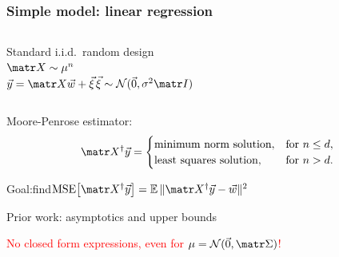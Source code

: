 \begin{frame}
  \frametitle{Simple model: linear regression}
  \begin{columns}
    \begin{column}{0.5\textwidth}
      \vspace{2mm}
      
      Standard i.i.d.~random design\\
$\X\sim\mu^n$\\
$\y=\X\w+\xib$\qquad$\xib\sim\Nc(\vec{0},\sigma^2\I)$
    \end{column}
    \begin{column}{0.4\textwidth}
    \end{column}
  \end{columns}
  
  
  Moore-Penrose estimator:
  \begin{align*}
    \X^\dagger\y =
      \begin{cases}
        \text{minimum norm solution},& \text{for }n\leq d,\\
        \text{least squares solution},& \text{for }n>d.
      \end{cases}
  \end{align*}
  
  Goal:\quad find\quad$\MSE{\X^\dagger\y}=\E\,\|\X^\dagger\y-\w\|^2$

    Prior work: asymptotics \cite{HMRT19_TR} and upper bounds
    \cite{BLLT19_TR}
    
  \textcolor{red}{No closed form expressions, even for
    $\mu=\Nc(\vec{0},\Sigmab)$!}
\end{frame}


